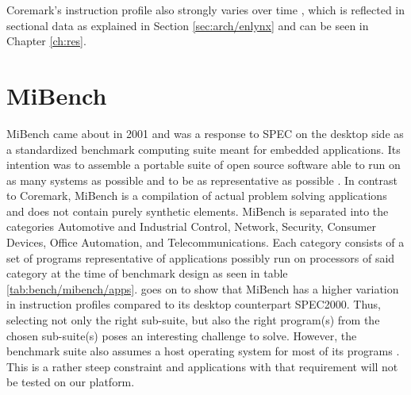 \documentclass[../bachelor_paper.tex]{subfiles}
\begin{document}
Coremark's instruction profile also strongly varies over time \cite{gal-onExploringCoremarkBenchmark2012}, which is reflected in sectional data as explained in Section \ref{sec:arch/enlynx} and can be seen in Chapter \ref{ch:res}.

\section{MiBench}
    \label{sec:bench:mibench}
MiBench came about in 2001 and was a response to \acs{SPEC} on the desktop side as a standardized benchmark computing suite meant for embedded applications. Its intention was to assemble a portable suite of open source software able to run on as many systems as possible and to be as representative as possible \cite{guthausMiBenchFreeCommercially2001}. In contrast to Coremark, MiBench is a compilation of actual problem solving applications and does not contain purely synthetic elements. MiBench is separated into the categories Automotive and
Industrial Control, Network, Security, Consumer Devices, Office Automation, and Telecommunications. Each category consists of a set of programs representative of applications possibly run on processors of said category at the time of benchmark design as seen in table \ref{tab:bench/mibench/apps}. \cite{guthausMiBenchFreeCommercially2001} goes on to show that MiBench has a higher variation in instruction profiles compared to its desktop counterpart \acs{SPEC}2000. Thus, selecting not only the right sub-suite, but also the right program(s) from the chosen sub-suite(s) poses an interesting challenge to solve. However, the benchmark suite also assumes a host operating system for most of its programs \cite{pallisterBEEBSOpenBenchmarks2013}. This is a rather steep constraint and applications with that requirement will not be tested on our platform.
\end{document}
